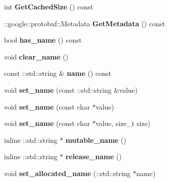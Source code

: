 \begin{DoxyCompactItemize}
int {\bfseries Get\+Cached\+Size} () const
\item 
\mbox{\label{classcaffe_1_1_net_parameter_ab0a78dfc5ff4a6144c4d358b9843c411}} 
\+::google\+::protobuf\+::\+Metadata {\bfseries Get\+Metadata} () const
\item 
\mbox{\label{classcaffe_1_1_net_parameter_aaa0c352d5b02fc9307eec14d7bde8c68}} 
bool {\bfseries has\+\_\+name} () const
\item 
\mbox{\label{classcaffe_1_1_net_parameter_ae3a168603a42ad89418d6caa36fcb007}} 
void {\bfseries clear\+\_\+name} ()
\item 
\mbox{\label{classcaffe_1_1_net_parameter_ac55a2849bb78b98782fdb06a7117dfe4}} 
const \+::std\+::string \& {\bfseries name} () const
\item 
\mbox{\label{classcaffe_1_1_net_parameter_aeed0497a5c81d2d4be17326b6f32c096}} 
void {\bfseries set\+\_\+name} (const \+::std\+::string \&value)
\item 
\mbox{\label{classcaffe_1_1_net_parameter_a330ed4723e02b22bef6bb0e1c43ff980}} 
void {\bfseries set\+\_\+name} (const char $\ast$value)
\item 
\mbox{\label{classcaffe_1_1_net_parameter_aabafe41aafc58db255304ed2016813aa}} 
void {\bfseries set\+\_\+name} (const char $\ast$value, size\+\_\+t size)
\item 
\mbox{\label{classcaffe_1_1_net_parameter_a49bff3ed7691f54168d31cd1a05d1d77}} 
inline \+::std\+::string $\ast$ {\bfseries mutable\+\_\+name} ()
\item 
\mbox{\label{classcaffe_1_1_net_parameter_a4031f13420c2248796181e7639e317f8}} 
inline \+::std\+::string $\ast$ {\bfseries release\+\_\+name} ()
\item 
\mbox{\label{classcaffe_1_1_net_parameter_a55fdb57c5deec855a49c9acdf04fc01e}} 
void {\bfseries set\+\_\+allocated\+\_\+name} (\+::std\+::string $\ast$name)

\end{DoxyCompactItemize}
